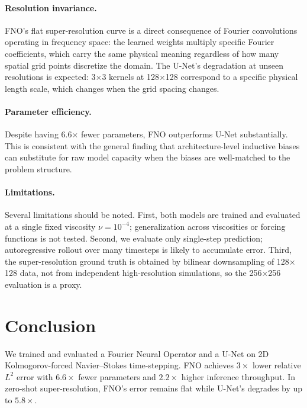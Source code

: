 \documentclass[11pt,twocolumn]{article}
\begin{document}
\paragraph{Resolution invariance.}
FNO's flat super-resolution curve is a direct consequence of Fourier convolutions
operating in frequency space: the learned weights multiply specific Fourier
coefficients, which carry the same physical meaning regardless of how many spatial
grid points discretize the domain.
The U-Net's degradation at unseen resolutions is expected: 3$\times$3 kernels at
128$\times$128 correspond to a specific physical length scale, which changes when
the grid spacing changes.

\paragraph{Parameter efficiency.}
Despite having 6.6$\times$ fewer parameters, FNO outperforms U-Net substantially.
This is consistent with the general finding that architecture-level inductive
biases can substitute for raw model capacity when the biases are well-matched to
the problem structure.

\paragraph{Limitations.}
Several limitations should be noted.
First, both models are trained and evaluated at a single fixed viscosity
$\nu = 10^{-4}$; generalization across viscosities or forcing functions is not
tested.
Second, we evaluate only single-step prediction; autoregressive rollout over many
timesteps is likely to accumulate error.
Third, the super-resolution ground truth is obtained by bilinear downsampling
of 128$\times$128 data, not from independent high-resolution simulations, so the
256$\times$256 evaluation is a proxy.

\section{Conclusion}
\label{sec:conclusion}

We trained and evaluated a Fourier Neural Operator and a U-Net on 2D
Kolmogorov-forced Navier--Stokes time-stepping.
FNO achieves $3\times$ lower relative $L^2$ error with $6.6\times$ fewer
parameters and $2.2\times$ higher inference throughput.
In zero-shot super-resolution, FNO's error remains flat while U-Net's degrades
by up to $5.8\times$.
\end{document}

